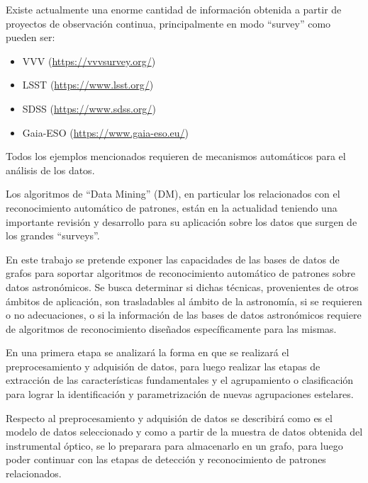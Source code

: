 	Existe actualmente una enorme cantidad de información obtenida a partir de proyectos de observación continua, principalmente en modo “survey”\cite{borne2008scientific,frinchaboy2012sdss} como pueden ser:
	\begin{itemize}
		\item VVV\cite{minniti2010vista} (\url{https://vvvsurvey.org/})
		\item LSST\cite{ivezic2007astrometry} (\url{https://www.lsst.org/})
		\item SDSS\cite{bundy2014overview} (\url{https://www.sdss.org/})
		\item Gaia-ESO\cite{gilmore2012gaia} (\url{https://www.gaia-eso.eu/})
	\end{itemize}
	
	Todos los ejemplos mencionados requieren de mecanismos automáticos para el análisis de los datos.
	
	Los algoritmos de “Data Mining” (DM), en particular los relacionados con el reconocimiento automático de patrones, están en la actualidad teniendo una importante revisión y desarrollo\cite{borne2009astroinformatics,ball2010data,schmeja2011identifying} para su aplicación sobre los datos que surgen de los grandes “surveys”. 
	
	En este trabajo se pretende exponer las capacidades de las bases de datos de grafos para soportar algoritmos de reconocimiento automático de patrones sobre datos astronómicos. Se busca determinar si dichas técnicas, provenientes de otros ámbitos de aplicación, son trasladables al ámbito de la astronomía, si se requieren o no adecuaciones, o si la información de las bases de datos astronómicos requiere de algoritmos de reconocimiento diseñados específicamente para las mismas.
	
	En una primera etapa se analizará la forma en que se realizará el preprocesamiento y adquisión de datos, para luego realizar las etapas de extracción de las características fundamentales y el agrupamiento o clasificación para lograr la identificación y parametrización de nuevas agrupaciones estelares.
	
	Respecto al preprocesamiento y adquisión de datos se describirá como es el modelo de datos seleccionado y como a partir de la muestra de datos obtenida del instrumental óptico, se lo preparara para almacenarlo en un grafo, para luego poder continuar con las etapas de detección y reconocimiento de patrones relacionados.
\fi
